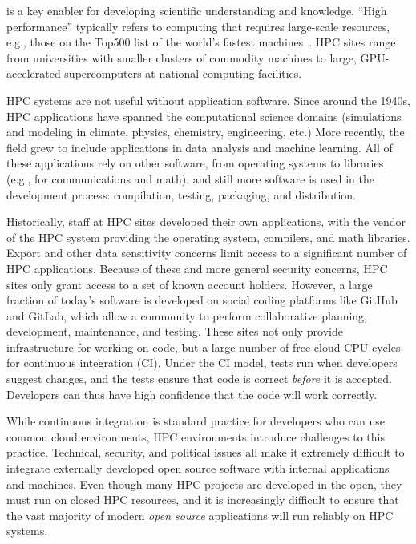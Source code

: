 \documentclass{IEEEcsmag}
\begin{document}
 is a key enabler for developing scientific understanding and knowledge.
``High performance'' typically refers to computing that requires large-scale
resources, e.g., those on the Top500 list of the world's fastest machines~\cite{top500}.
HPC sites range from universities with smaller clusters of commodity machines to large,
GPU-accelerated supercomputers at national computing facilities.

HPC systems are not useful without application software. Since around the 1940s, HPC
applications have spanned the computational science domains (simulations and modeling in
climate, physics, chemistry, engineering, etc.) More recently, the field grew
to include applications in data analysis and machine learning.
All of these applications rely on other software, from operating systems to libraries
(e.g., for communications and math), and still more software is used in the development
process: compilation, testing, packaging, and distribution.

Historically, staff at HPC sites developed their own applications, with the vendor of the
HPC system providing the operating system, compilers, and math libraries. Export and
other data sensitivity concerns limit access to a significant number of HPC applications.
Because of these and more general security concerns, HPC sites only grant access to a set
of known account holders. However, a large fraction of
today's software is developed on social coding platforms like GitHub and GitLab, which
allow a community to perform collaborative planning, development, maintenance, and
testing. These sites not only provide infrastructure for working on code, but a large
number of free cloud CPU cycles for continuous integration (CI). Under the CI model,
tests run when developers suggest changes, and the tests ensure that code is
correct {\it before} it is accepted. Developers can thus have high confidence that
the code will work correctly.

While continuous integration is standard practice for developers who can use common
cloud environments, HPC environments introduce challenges to this practice. Technical,
security, and political issues all make it extremely difficult to integrate externally
developed open source software with internal applications and machines. Even though many
HPC projects are developed in the open, they must run on closed HPC resources, and it is
increasingly difficult to ensure that the vast majority of modern {\it open source}
applications will run reliably on HPC systems.
\end{document}
